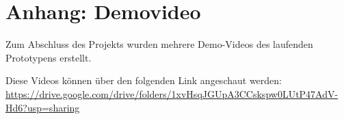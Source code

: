 \chapter{Anhang: Demovideo} \label{appendix-demo}

Zum Abschluss des Projekts wurden mehrere Demo-Videos des laufenden Prototypens erstellt.

Diese Videos können über den folgenden Link angeschaut werden: \newline
\url{https://drive.google.com/drive/folders/1xvHsqJGUpA3CCskspw0LUtP47AdV-Hd6?usp=sharing}
